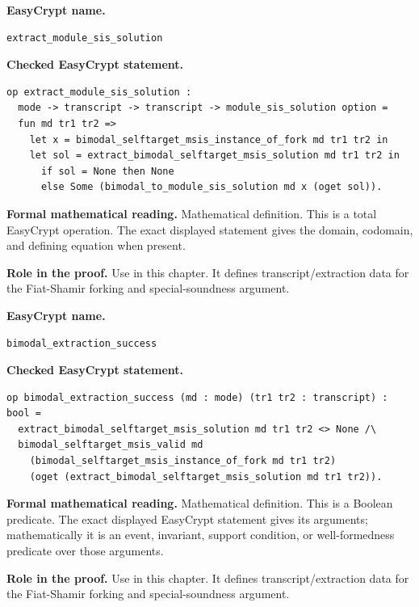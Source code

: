 \begin{formaldefinition}
\noindent\textbf{EasyCrypt name.}
\begin{lstlisting}[language=EasyCrypt,basicstyle=\ttfamily\scriptsize]
extract_module_sis_solution
\end{lstlisting}
\noindent\textbf{Checked EasyCrypt statement.}
\begin{lstlisting}[language=EasyCrypt,basicstyle=\ttfamily\scriptsize]
op extract_module_sis_solution :
  mode -> transcript -> transcript -> module_sis_solution option =
  fun md tr1 tr2 =>
    let x = bimodal_selftarget_msis_instance_of_fork md tr1 tr2 in
    let sol = extract_bimodal_selftarget_msis_solution md tr1 tr2 in
      if sol = None then None
      else Some (bimodal_to_module_sis_solution md x (oget sol)).
\end{lstlisting}
\noindent\textbf{Formal mathematical reading.}
Mathematical definition. This is a total EasyCrypt operation.  The exact displayed statement gives the domain, codomain, and defining equation when present.

\noindent\textbf{Role in the proof.}
Use in this chapter. It defines transcript/extraction data for the Fiat-Shamir forking and special-soundness argument.

\end{formaldefinition}

\begin{formaldefinition}
\noindent\textbf{EasyCrypt name.}
\begin{lstlisting}[language=EasyCrypt,basicstyle=\ttfamily\scriptsize]
bimodal_extraction_success
\end{lstlisting}
\noindent\textbf{Checked EasyCrypt statement.}
\begin{lstlisting}[language=EasyCrypt,basicstyle=\ttfamily\scriptsize]
op bimodal_extraction_success (md : mode) (tr1 tr2 : transcript) : bool =
  extract_bimodal_selftarget_msis_solution md tr1 tr2 <> None /\
  bimodal_selftarget_msis_valid md
    (bimodal_selftarget_msis_instance_of_fork md tr1 tr2)
    (oget (extract_bimodal_selftarget_msis_solution md tr1 tr2)).
\end{lstlisting}
\noindent\textbf{Formal mathematical reading.}
Mathematical definition. This is a Boolean predicate.  The exact displayed EasyCrypt statement gives its arguments; mathematically it is an event, invariant, support condition, or well-formedness predicate over those arguments.

\noindent\textbf{Role in the proof.}
Use in this chapter. It defines transcript/extraction data for the Fiat-Shamir forking and special-soundness argument.

\end{formaldefinition}

